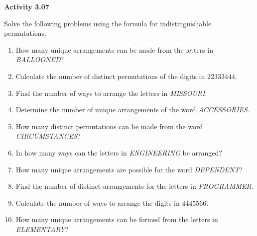 \vspace{0.3ex}
\noindent\textbf{Activity 3.07}

\vspace{0.2ex}

Solve the following problems using the formula for indistinguishable permutations.

\begin{enumerate}[label=\color{blue}\arabic*.]
    \item How many unique arrangements can be made from the letters in \textit{BALLOONED}?
    \item Calculate the number of distinct permutations of the digits in \(22333444\).
    \item Find the number of ways to arrange the letters in \textit{MISSOURI}.
    \item Determine the number of unique arrangements of the word \textit{ACCESSORIES}.
    \item How many distinct permutations can be made from the word \textit{CIRCUMSTANCES}?
    \item In how many ways can the letters in \textit{ENGINEERING} be arranged?
    \item How many unique arrangements are possible for the word \textit{DEPENDENT}?
    \item Find the number of distinct arrangements for the letters in \textit{PROGRAMMER}.
    \item Calculate the number of ways to arrange the digits in \(4445566\).
    \item How many unique arrangements can be formed from the letters in \textit{ELEMENTARY}?
\end{enumerate}
